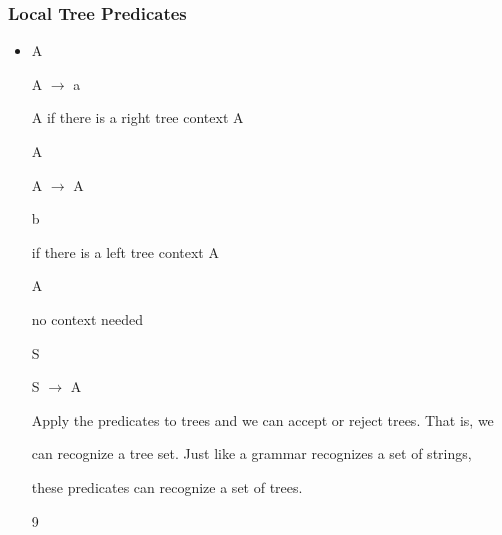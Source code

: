 \documentclass[compress,color=usenames]{beamer}
\begin{document}
\begin{frame}
\frametitle{Local Tree Predicates}

\begin{itemize}
\item

A





A $\rightarrow$ a





A if there is a right tree context A


A





A $\rightarrow$ A





b





if there is a left tree context A





A





no context needed





S





S $\rightarrow$ A





Apply the predicates to trees and we can accept or reject trees. That is, we


can recognize a tree set. Just like a grammar recognizes a set of strings,


these predicates can recognize a set of trees.


9




\end{itemize}

\end{frame}
\end{document}
